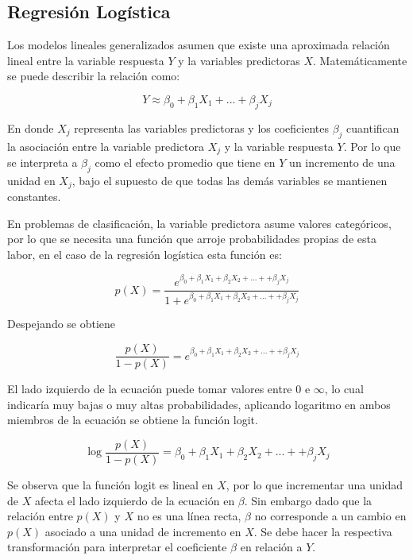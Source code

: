 \documentclass[a4paper,12pt]{Latex/Classes/PhDthesisPSnPDF}
\begin{document}
\subsection{Regresión Logística}

Los modelos lineales generalizados asumen que existe una aproximada relación lineal entre la variable respuesta $Y$ y la variables predictoras $X$. Matemáticamente se puede describir la relación como:

$$ Y \approx \beta_{0} + \beta_{1}X_{1} + ... + \beta_{j}X_{j} $$

En donde $X_{j}$ representa las variables predictoras y los coeficientes $\beta_{j}$ cuantifican la asociación entre la variable predictora $X_{j}$ y la variable respuesta $Y$. Por lo que se interpreta a $\beta_{j}$ como el efecto promedio que tiene en $Y$ un incremento de una unidad en $X_{j}$, bajo el supuesto de que todas las demás variables se mantienen constantes.


En problemas de clasificación, la variable predictora asume valores categóricos, por lo que se necesita una función que arroje probabilidades propias de esta labor, en el caso de la regresión logística esta función es:

$$
p(X) = \frac{e^{\beta_{0} + \beta_{1}X_{1} + \beta_{2}X_{2} + ... + + \beta_{j}X_{j} }}{1 + e^{\beta_{0} + \beta_{1}X_{1} + \beta_{2}X_{2} + ... + + \beta_{j}X_{j} }}
$$

Despejando se obtiene

$$ \frac{p(X)}{1 - p(X)} = e^{\beta_{0} + \beta_{1}X_{1} + \beta_{2}X_{2} + ... + + \beta_{j}X_{j} } $$

El lado izquierdo de la ecuación puede tomar valores entre 0 e $\infty$, lo cual indicaría muy bajas o muy altas probabilidades, aplicando logaritmo en ambos miembros de la ecuación se obtiene la función logit.

$$ \log{\frac{p(X)}{1 - p(X)}} = \beta_{0} + \beta_{1}X_{1} + \beta_{2}X_{2} + ... + + \beta_{j}X_{j}  $$

Se observa que la función logit es lineal en $X$, por lo que incrementar una unidad de $X$ afecta el lado izquierdo de la ecuación en $\beta$. Sin embargo dado que la relación entre $p(X)$ y $X$ no es una línea recta, $\beta$ no corresponde a un cambio en $p(X)$ asociado a una unidad de incremento en $X$. Se debe hacer la respectiva transformación para interpretar el coeficiente $\beta$ en relación a $Y$.
\end{document}
